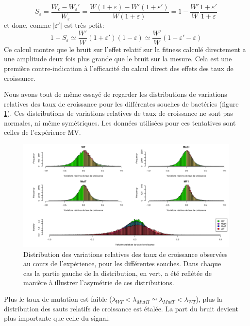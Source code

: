 \documentclass[12pt]{article}
\newcommand{\abs}[1]{\left|#1\right|}
\begin{document}
\[S_\varepsilon=\frac{W_\varepsilon - W_\varepsilon'}{W_\varepsilon} 
= \frac{W(1+\varepsilon) - W'(1+\varepsilon')}{W(1+\varepsilon)}
= 1 - \frac{W'}{W}\frac{1+\varepsilon'}{1+\varepsilon}\]
et donc, comme $\abs{\varepsilon'}$ est très petit:
\[1 - S_\varepsilon \simeq \frac{W'}{W}(1+\varepsilon')(1-\varepsilon)\simeq \frac{W'}{W}(1+\varepsilon'-\varepsilon)\]
Ce calcul montre que le bruit sur l'effet relatif sur la fitness calculé directement a une amplitude deux fois plus grande que le bruit sur la mesure. Cela est une première contre-indication à l'efficacité du calcul direct des effets des taux de croissance.

Nous avons tout de même essayé de regarder les distributions de variations relatives des taux de croissance pour les différentes souches de bactéries (figure \ref{fig:VarRel}). Ces distributions de variations relatives de taux de croissance ne sont pas normales, ni même symétriques. Les données utilisées pour ces tentatives sont celles de l'expérience MV.

\begin{figure}[!h]
  \begin{center}
    \vspace{3mm}
    \includegraphics[scale=0.3]{../Img/Variations_relatives_GR.png}
  \end{center} 
  \caption{\label{fig:VarRel}Distribution des variations relatives des taux de croissance observées au cours de l'expérience, pour les différentes souches. Dans chaque cas la partie gauche de la distribution, en vert, a été reflétée de manière à illustrer l'asymétrie de ces distributions.}
\end{figure}

Plus le taux de mutation est faible ($\lambda_{WT} < \lambda_{MutH} \simeq \lambda_{MutT} < \lambda_{WT}$), plus la distribution des sauts relatifs de croissance est étalée. La part du bruit devient plus importante que celle du signal.
\end{document}
